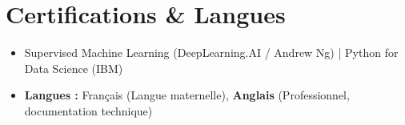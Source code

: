 ﻿\documentclass[a4paper,11pt]{article}
\begin{document}
\section{Certifications \& Langues}
\begin{itemize}[leftmargin=*, nosep]
    \item \small{Supervised Machine Learning (DeepLearning.AI / Andrew Ng) | Python for Data Science (IBM)}
    \item \small{\textbf{Langues :} Français (Langue maternelle), \textbf{Anglais} (Professionnel, documentation technique)}
\end{itemize}
\end{document}

